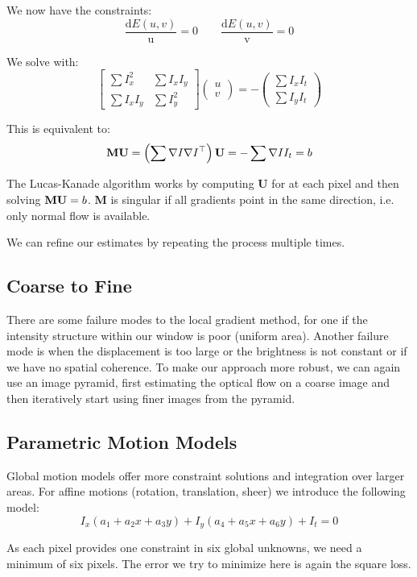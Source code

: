 We now have the constraints:
$$\frac{\mathrm d E(u, v)}{\mathrm u} = 0 \qquad \frac{\mathrm d E(u, v)}{\mathrm v} = 0$$

We solve with:
$$
\begin{bmatrix}
	\sum I_x^2 & \sum I_x I_y \\
	\sum I_x I_y & \sum I_y^2
\end{bmatrix}
\begin{pmatrix}
	u \\
	v
\end{pmatrix}
= -
\begin{pmatrix}
	\sum I_x I_t \\
	\sum I_y I_t
\end{pmatrix}
$$

This is equivalent to:
$$\textbf M \textbf U = \left( \sum \nabla I \nabla I^\top \right) \textbf U = - \sum \nabla I I_t = b$$

The Lucas-Kanade algorithm works by computing \textbf U for at each pixel and then solving $\textbf M \textbf U = b$. \textbf M is singular if all gradients point in the same direction, i.e. only normal flow is available. \medskip

We can refine our estimates by repeating the process multiple times.


\subsection{Coarse to Fine}

There are some failure modes to the local gradient method, for one if the intensity structure within our window is poor (uniform area). Another failure mode is when the displacement is too large or the brightness is not constant or if we have no spatial coherence. To make our approach more robust, we can again use an image pyramid, first estimating the optical flow on a coarse image and then iteratively start using finer images from the pyramid.


\subsection{Parametric Motion Models}

Global motion models offer more constraint solutions and integration over larger areas. For affine motions (rotation, translation, sheer) we introduce the following model:
$$I_x (a_1 + a_2 x + a_3 y) + I_y (a_4 + a_5 x + a_6 y) + I_t = 0$$

As each pixel provides one constraint in six global unknowns, we need a minimum of six pixels. The error we try to minimize here is again the square loss. \medskip

